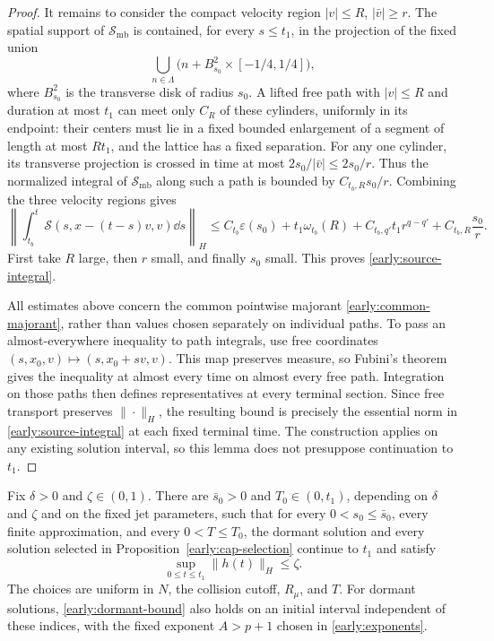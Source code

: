 \begin{proof}
It remains to consider the compact velocity region
$|v|\le R$, $|\bar v|\ge r$. The spatial support of $\mathcal S_{\mathrm{mb}}$ is contained,
for every $s\le t_1$, in the projection of the fixed union
\[
 \bigcup_{n\in\Lambda}
     \bigl(n+B^2_{s_0}\times[-1/4,1/4]\bigr),
\]
where $B^2_{s_0}$ is the transverse disk of radius $s_0$.
A lifted free path with $|v|\le R$ and duration at most $t_1$ can meet
only $C_R$ of these cylinders, uniformly in its endpoint: their centers
must lie in a fixed bounded enlargement of a segment of length at most
$Rt_1$, and the lattice has a fixed separation.
For any one cylinder, its transverse projection is crossed in time at
most $2s_0/|\bar v|\le2s_0/r$.
Thus the normalized integral of $\mathcal S_{\mathrm{mb}}$ along such a path is bounded by
$C_{t_b,R}s_0/r$. Combining the three velocity regions gives
\[
 \left\|\int_{t_b}^t
     \mathcal S(s,x-(t-s)v,v)\dd s\right\|_H
 \le C_{t_b}\varepsilon(s_0)
      +t_1\omega_{t_b}(R)
      +C_{t_b,q'}t_1r^{q-q'}
      +C_{t_b,R}\frac{s_0}{r}.
\]
First take $R$ large, then $r$ small, and finally $s_0$ small.
This proves \eqref{early:source-integral}.

All estimates above concern the common pointwise majorant
\eqref{early:common-majorant}, rather than values chosen separately on
individual paths. To pass an almost-everywhere inequality to path
integrals, use free coordinates $(s,x_0,v)\mapsto(s,x_0+sv,v)$.
This map preserves measure, so Fubini's theorem gives the inequality at
almost every time on almost every free path. Integration on those paths
then defines representatives at every terminal section. Since free
transport preserves $\|\cdot\|_H$, the resulting bound is precisely the
essential norm in \eqref{early:source-integral} at each fixed terminal
time. The construction applies on any existing solution interval, so
this lemma does not presuppose continuation to $t_1$.
\end{proof}

\begin{proposition}\label{early:continuation}
Fix $\delta>0$ and $\zeta\in(0,1)$.
There are $\bar s_0>0$ and $T_0\in(0,t_1)$, depending on $\delta$ and
$\zeta$ and on the fixed jet parameters, such that for every
$0<s_0\le\bar s_0$, every finite approximation, and every
$0<T\le T_0$, the dormant solution and every solution selected in
Proposition~\ref{early:cap-selection} continue to $t_1$ and satisfy
\begin{equation}\label{early:small-hot}
 \sup_{0\le t\le t_1}\|h(t)\|_H\le\zeta.
\end{equation}
The choices are uniform in $N$, the collision cutoff, $R_\mu$, and $T$.
For dormant solutions, \eqref{early:dormant-bound} also holds on an
initial interval independent of these indices, with the fixed exponent
$A>p+1$ chosen in \eqref{early:exponents}.
\end{proposition}

